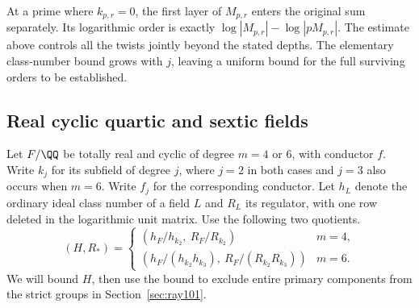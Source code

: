 \documentclass[a4paper,11pt]{article}
\theoremstyle{definition}
\theoremstyle{remark}
\numberwithin{equation}{section}
\begin{document}
At a prime where \(k_{p,r}=0\), the first layer of \(M_{p,r}\)
enters the original sum separately. Its logarithmic order is
exactly \(\log|M_{p,r}|-\log|pM_{p,r}|\). The estimate above
controls all the twists jointly beyond the stated depths. The
elementary class-number bound grows with \(j\), leaving a
uniform bound for the full surviving orders to be established.

\subsection{Real cyclic quartic and sextic fields}\label{nav:III-27}
\label{sec:units195}

Let \(F/\QQ\) be totally real and cyclic of degree \(m=4\) or
\(6\), with conductor \(f\). Write \(k_j\) for its subfield of
degree \(j\), where \(j=2\) in both cases and \(j=3\) also occurs
when \(m=6\). Write \(f_j\) for the corresponding conductor.
Let \(h_L\) denote the ordinary ideal class number of a field \(L\)
and \(R_L\) its regulator, with one row deleted in the logarithmic unit
matrix. Use the following two quotients.
\[
 (H,R_*)=
 \begin{cases}
 (h_F/h_{k_2},\ R_F/R_{k_2})&m=4,\\
 (h_F/(h_{k_2}h_{k_3}),\ R_F/(R_{k_2}R_{k_3}))&m=6.
 \end{cases}
\]
We will bound \(H\), then use the bound to exclude entire
primary components from the strict groups in Section~\ref{sec:ray101}.
\end{document}
